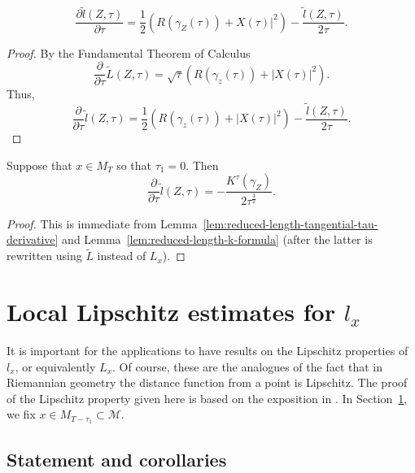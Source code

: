 \begin{lemma}\label{lem:reduced-length-tangential-tau-derivative}
\label{tildeltau}
$$\frac{\partial \widetilde
l(Z,\tau)}{\partial
\tau}=\frac{1}{2}\left(R(\gamma_Z(\tau))+X(\tau)|^2\right)-\frac{\widetilde
l(Z,\tau)}{2\tau}.$$
\end{lemma}

\begin{proof}
By the Fundamental Theorem of Calculus
$$\frac{\partial}{\partial\tau}\widetilde L(Z,\tau)=\sqrt{\tau}\left(R(\gamma_z(\tau))+|X(\tau)|^2\right).$$
Thus,
$$\frac{\partial}{\partial\tau}\widetilde l(Z,\tau)=\frac{1}{2}\left(R(\gamma_z(\tau))+|X(\tau)|^2\right)
-\frac{\widetilde l(Z,\tau)}{2\tau}.$$
\end{proof}

\begin{corollary}\label{cor:reduced-length-tangential-k-derivative}
\label{tildelK}
Suppose that $x\in M_T$ so that
$\tau_1=0$. Then
$$\frac{\partial}{\partial\tau}\widetilde
l(Z,\tau)=-\frac{K^\tau(\gamma_Z)}{2\tau^{\frac{3}{2}}}.$$
\end{corollary}

\begin{proof}
This is immediate from Lemma~\ref{lem:reduced-length-tangential-tau-derivative} and Lemma~\ref{lem:reduced-length-k-formula} (after the
latter is rewritten using $\widetilde L$ instead of $L_x$).
\end{proof}



\section{Local Lipschitz estimates for $l_x$}\label{sect:lips}

It is important for the applications to have results on the
Lipschitz properties of $l_x$, or equivalently $L_x$. Of course,
these are the analogues of the fact that in Riemannian geometry the
distance function from a point is Lipschitz. The proof of the
Lipschitz property given here is based on the exposition in
\cite{Ye}. In Section~\ref{sect:lips}, we fix $x\in
M_{T-\tau_1}\subset {\mathcal M}$.

\subsection{Statement and corollaries}


